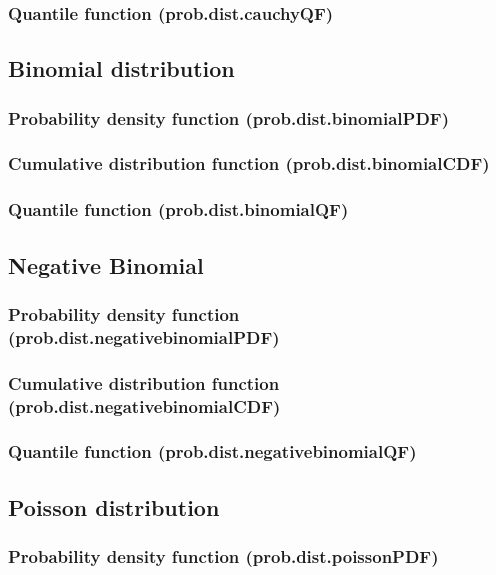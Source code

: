 \documentclass{article}
\theoremstyle{definition}
\begin{document}
\subsubsection{Quantile function (prob.dist.cauchyQF)}

\subsection{Binomial distribution}
\subsubsection{Probability density function (prob.dist.binomialPDF)}
\subsubsection{Cumulative distribution function (prob.dist.binomialCDF)}
\subsubsection{Quantile function (prob.dist.binomialQF)}

\subsection{Negative Binomial}
\subsubsection{Probability density function (prob.dist.negativebinomialPDF)}
\subsubsection{Cumulative distribution function (prob.dist.negativebinomialCDF)}
\subsubsection{Quantile function (prob.dist.negativebinomialQF)}

\subsection{Poisson distribution}
\subsubsection{Probability density function (prob.dist.poissonPDF)}
\end{document}
